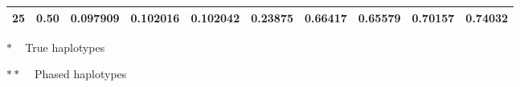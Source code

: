 \begin{table}[!htb]
\begin{threeparttable}
\begin{tabular}{cc*8{S[table-format=1.3]}}
25 & 0.50  &  0.097909 & 0.102016 & 0.102042 & \bfseries 0.23875  &  0.66417 & \bfseries 0.65579 & 0.70157 & 0.74032 \\
\bottomrule
\end{tabular}
\begin{tablenotes}\footnotesize
	\item[$\ast$] ~ True haplotypes
	\item[$\ast\ast$] ~ Phased haplotypes
\end{tablenotes}
\end{threeparttable}
\end{table}







